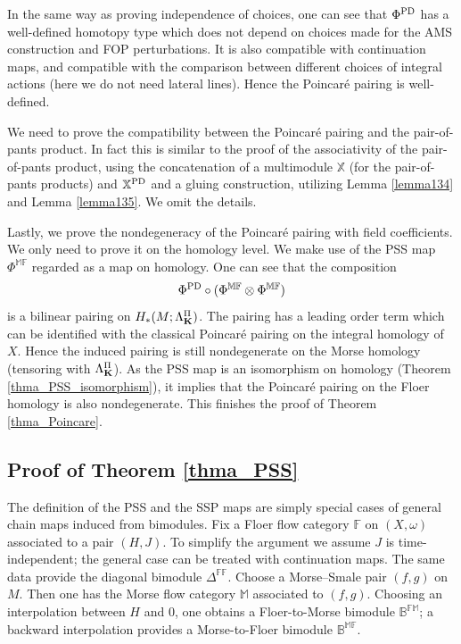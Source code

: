 \documentclass[reqno, 10pt]{amsart}
\numberwithin{equation}{section}
\numberwithin{equation}{section}
\theoremstyle{definition}
\theoremstyle{remark}
\newcommand{\beqn}{\begin{equation*}}
\newcommand{\eeqn}{\end{equation*}}
\newcommand{\mb}{\mathbb}
\begin{document}
In the same way as proving independence of choices, one can see that $\Phi^{\rm PD}$ has a well-defined homotopy type which does not depend on choices made for the AMS construction and FOP perturbations. It is also compatible with continuation maps, and compatible with the comparison between different choices of integral actions (here we do not need lateral lines). Hence the Poincar\'e pairing is well-defined. 

We need to prove the compatibility between the Poincar\'e pairing and the pair-of-pants product. In fact this is similar to the proof of the associativity of the pair-of-pants product, using the concatenation of a multimodule ${\mb X}$ (for the pair-of-pants products) and ${\mb X}^{\rm PD}$ and a gluing construction, utilizing Lemma \ref{lemma134} and Lemma \ref{lemma135}. We omit the details.

Lastly, we prove the nondegeneracy of the Poincar\'e pairing with field coefficients. We only need to prove it on the homology level. We make use of the PSS map $\Phi^{\mb{MF}}$ regarded as a map on homology. One can see that the composition
\beqn
\Phi^{\rm PD} \circ (\Phi^{\mb{MF}}\otimes \Phi^{\mb{MF}})
\eeqn
is a bilinear pairing on $H_*(M; \Lambda_{\bf K}^\Pi)$. The pairing has a leading order term which can be identified with the classical Poincar\'e pairing on the integral homology of $X$. Hence the induced pairing is still nondegenerate on the Morse homology (tensoring with $\Lambda_{\bf K}^\Pi$). As the PSS map is an isomorphism on homology (Theorem \ref{thma_PSS_isomorphism}), it implies that the Poincar\'e pairing on the Floer homology is also nondegenerate. This finishes the proof of Theorem \ref{thma_Poincare}.




\subsection{Proof of Theorem \ref{thma_PSS}}


The definition of the PSS and the SSP maps are simply special cases of general chain maps induced from bimodules. Fix a Floer flow category ${\mb F}$ on $(X, \omega)$ associated to a pair $(H, J)$. To simplify the argument we assume $J$ is time-independent; the general case can be treated with continuation maps. The same data provide the diagonal bimodule $\mb{\Delta}^{\mb{FF}}$. Choose a Morse--Smale pair $(f, g)$ on $M$. Then one has the Morse flow category ${\mb M}$ associated to $(f, g)$. Choosing an interpolation between $H$ and $0$, one obtains a Floer-to-Morse bimodule $\mb{B}^{\mb{FM}}$; a backward interpolation provides a Morse-to-Floer bimodule $\mb{B}^{\mb{MF}}$.
\end{document}

